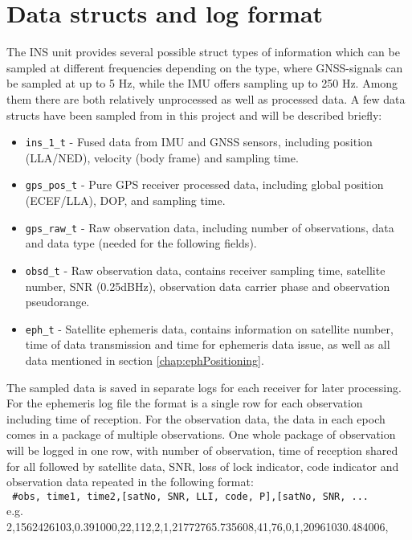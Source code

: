 \section{Data structs and log format}\label{structsAndLogs}
The INS unit provides several possible struct types of information which can be sampled at different frequencies depending on the type, where GNSS-signals can be sampled at up to 5 Hz, while the IMU offers sampling up to 250 Hz. Among them there are both relatively unprocessed as well as processed data. A few data structs have been sampled from in this project and will be described briefly:
\begin{itemize}
\item \texttt{ins\_1\_t} - Fused data from IMU and GNSS sensors, including position (LLA/NED), velocity (body frame) and sampling time.
\item \texttt{gps\_pos\_t} - Pure GPS receiver processed data, including global position (ECEF/LLA), DOP, and sampling time.
\item \texttt{gps\_raw\_t} - Raw observation data, including number of observations, data and data type (needed for the following fields).
\item \texttt{obsd\_t} - Raw observation data, contains receiver sampling time, satellite number, SNR (0.25dBHz), observation data carrier phase and observation pseudorange.
\item \texttt{eph\_t} - Satellite ephemeris data, contains information on satellite number, time of data transmission and time for ephemeris data issue, as well as all data mentioned in section \ref{chap:ephPositioning}.
\end{itemize}
The sampled data is saved in separate logs for each receiver for later processing. For the ephemeris log file the format is a single row for each observation including time of reception. For the observation data, the data in each epoch comes in a package of multiple observations. One whole package of observation will be logged in one row, with number of observation, time of reception shared for all followed by satellite data, SNR, loss of lock indicator, code indicator and observation data repeated in the following format: \\
\texttt{ \#obs, time1, time2,[satNo, SNR, LLI, code, P],[satNo, SNR, ...}\\
e.g.\\
\hspace{-2 cm}2,1562426103,0.391000,22,112,2,1,21772765.735608,41,76,0,1,20961030.484006,

